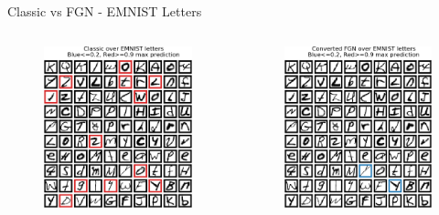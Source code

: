 \documentclass{beamer}
\begin{document}
\begin{frame}{Classic vs FGN - EMNIST Letters \cite{cohen2017emnist}}
    \vspace{-2mm}
    \begin{columns}
    \begin{column}{.33\textwidth}
    \begin{figure}
        \includegraphics[width=.85\textwidth]{images/Letters/classic-letters.png}
    \end{figure}
    \end{column}
    \begin{column}{.33\textwidth}
    \begin{figure}
        \includegraphics[width=.85\textwidth]{images/Letters/converted-letters.png}

\end{figure}
\end{column}
\end{columns}
\end{frame}
\end{document}
